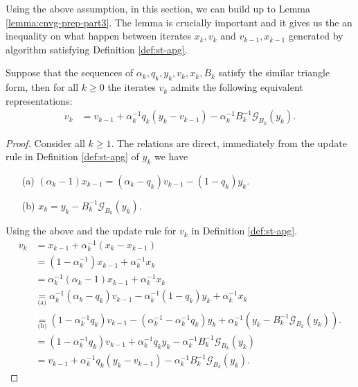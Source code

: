 \documentclass[12pt]{article}
\begin{document}
    Using the above assumption, in this section, we can build up to Lemma \ref{lemma:cnvg-prep-part3}. 
    The lemma is crucially important and it gives us the an inequality on what happen between iterates $x_{k}, v_{k}$ and $v_{k - 1}, x_{k - 1}$ generated by algorithm satisfying Definition \ref{def:st-apg}. 
    \begin{lemma}\label{lemma:st-iterates-alt-form-part1}
        Suppose that the sequences of $\alpha_k, q_k, y_k, v_k, x_k, B_k$ satisfy the similar triangle form, then for all $k \ge 0$ the iterates $v_k$ admits the following equivalent representations: 
        \begin{align*}
            v_k
            &= v_{k - 1} + \alpha_k^{-1}q_k(y_k - v_{k - 1}) - \alpha_{k}^{-1}B_k^{-1}\mathcal G_{B_k}(y_k). 
        \end{align*}
    \end{lemma}
    \begin{proof}
        Consider all $k \ge 1$. 
        The relations are direct, immediately from the update rule in Definition \ref{def:st-apg} of $y_k$ we have
        \begin{enumerate}[nosep]
            \item[(a)] $(\alpha_k - 1)x_{k - 1} = (\alpha_k - q_k)v_{k - 1} - (1 - q_k)y_k$. 
            \item[(b)] $x_k = y_k - B_k^{-1}\mathcal G_{B_k}(y_k)$. 
        \end{enumerate}
        Using the above and the update rule for $v_k$ in Definition \ref{def:st-apg}. 
        \begin{align*}
            v_k &= x_{k - 1} + \alpha_k^{-1}(x_k - x_{k - 1})
            \\
            &= (1 - \alpha_k^{-1})x_{k - 1} + \alpha_k^{-1}x_k
            \\
            &= \alpha_k^{-1}(\alpha_k - 1)x_{k - 1} + \alpha_k^{-1}x_k
            \\
            &\underset{\text{(a)}}{=} \alpha_k^{-1}(\alpha_k - q_k)v_{k - 1} - \alpha_{k}^{-1}(1 - q_k)y_k 
            + \alpha_k^{-1}x_k
            \\
            &\underset{\text{(b)}}{=} (1 - \alpha_k^{-1}q_k) v_{k - 1} - (\alpha_k^{-1} - \alpha_k^{-1}q_k)y_k
            + \alpha_k^{-1}(y_k - B_k^{-1}\mathcal G_{B_k}(y_k)). 
            \\
            &= 
            (1 - \alpha_k^{-1}q_k) v_{k - 1} + \alpha_k^{-1}q_ky_k
            - \alpha_k^{-1}B_k^{-1}\mathcal G_{B_k}(y_k)
            \\
            &= v_{k - 1} + \alpha_k^{-1}q_k(y_k - v_{k - 1}) - \alpha_{k}^{-1}B_k^{-1}\mathcal G_{B_k}(y_k). 
        \end{align*}
    \end{proof}
\end{document}
